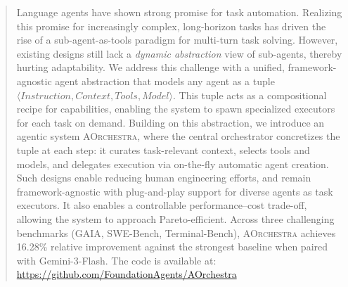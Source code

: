 
\begin{abstract}


Language agents have shown strong promise for task automation. 
% 
Realizing this promise for increasingly complex, long-horizon tasks has driven the rise of a sub-agent-as-tools paradigm for multi-turn task solving. 
% 
However, existing designs still lack a \emph{dynamic abstraction} view of sub-agents, thereby hurting adaptability.
% 
We address this challenge with a unified, framework-agnostic agent abstraction that models any agent as a tuple $\langle Instruction, Context,Tools,Model \rangle$. This tuple acts as a compositional recipe for capabilities, enabling the system to spawn specialized executors for each task on demand. 
Building on this abstraction, we introduce an agentic system \textsc{AOrchestra}, where the central orchestrator concretizes the tuple at each step: it curates task-relevant context, selects tools and models, and delegates execution via on-the-fly automatic agent creation.
Such designs enable reducing human engineering efforts, and remain framework-agnostic with plug-and-play support for diverse agents as task executors. It also enables a controllable performance–cost trade-off, allowing the system to approach Pareto-efficient.
Across three challenging benchmarks (GAIA, SWE-Bench, Terminal-Bench), \textsc{AOrchestra} achieves 16.28\% relative improvement against the strongest baseline when paired with Gemini-3-Flash. The code is available at: \url{https://github.com/FoundationAgents/AOrchestra  }


\end{abstract}
